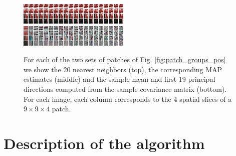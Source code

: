 \documentclass[10pt, journal, twocolumn, final, a4paper]{IEEEtran}
\begin{document}
\begin{figure}[htpb!]
	\includegraphics[width = \columnwidth]{figs/patch_groups/patch_group_bus_255_056_010_s40_wx37_wt2_sx9_st4_r040_n200_orig.png}\\
	\vspace{.2cm}
	\includegraphics[width = \columnwidth]{figs/patch_groups/patch_group_bus_255_056_010_s40_wx37_wt2_sx9_st4_r040_n200_pcas.png}\\
	\vspace{.2cm}
	\caption{For each of the two sets of patches of Fig. \ref{fig:patch_groups_pos} we show
	the 20 nearest neighbors (top), the corresponding MAP estimates (middle) and the sample mean 
	and first 19 principal directions computed from the sample covariance matrix (bottom).
	For each image, each column corresponds to the 4 spatial slices of a $9\times9\times4$ patch.}
	\label{fig:patch_groups_patches}
\end{figure}

\section{Description of the algorithm}
\label{sec:algorithm}
\end{document}

